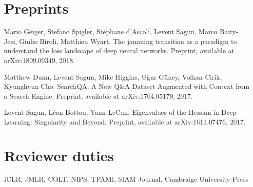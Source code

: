 \documentclass[10pt,letterpaper]{article}
\renewenvironment{itemize}
{
\begin{list}{}{\setlength{\leftmargin}{1.5em}}
}
{
  \end{list}
}
\begin{document}
\section*{Preprints}
\begin{itemize}

\item Mario Geiger, Stefano Spigler, St\'ephane d'Ascoli, Levent Sagun, Marco Baity-Jesi, Giulio Biroli, Matthieu Wyart. The jamming transition as a paradigm to understand the loss landscape of deep neural networks. Preprint, available at arXiv:1809.09349, 2018.

\item Matthew Dunn, Levent Sagun, Mike Higgins, U\u{g}ur G\"uney, Volkan Cirik, Kyunghyun Cho. SearchQA: A New Q\&A Dataset Augmented with Context from a Search Engine. Preprint, available at arXiv:1704.05179, 2017.

\item Levent Sagun, L\'eon Bottou, Yann LeCun. Eigenvalues of the Hessian in Deep Learning: Singularity and Beyond. Preprint, available at arXiv:1611.07476, 2017.
\end{itemize}


\section*{Reviewer duties}
\begin{itemize}
    \item ICLR, JMLR,  COLT, NIPS, TPAMI, SIAM Journal, Cambridge University Press
\end{itemize}

\end{document}
